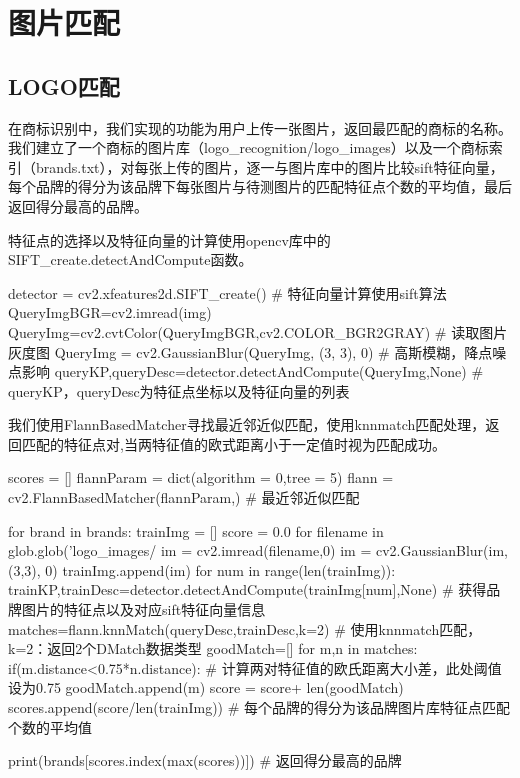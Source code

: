 
\chapter{图片匹配}

\section{LOGO匹配}

在商标识别中，我们实现的功能为用户上传一张图片，返回最匹配的商标的名称。我们建立了一个商标的图片库（logo\_recognition/logo\_images）以及一个商标索引（brands.txt），对每张上传的图片，逐一与图片库中的图片比较sift特征向量，每个品牌的得分为该品牌下每张图片与待测图片的匹配特征点个数的平均值，最后返回得分最高的品牌。

特征点的选择以及特征向量的计算使用opencv库中的SIFT\_create.detectAndCompute函数。

\begin{python}
detector = cv2.xfeatures2d.SIFT_create() # 特征向量计算使用sift算法
QueryImgBGR=cv2.imread(img)
QueryImg=cv2.cvtColor(QueryImgBGR,cv2.COLOR_BGR2GRAY) # 读取图片灰度图
QueryImg = cv2.GaussianBlur(QueryImg, (3, 3), 0) # 高斯模糊，降点噪点影响
queryKP,queryDesc=detector.detectAndCompute(QueryImg,None) # queryKP，queryDesc为特征点坐标以及特征向量的列表
\end{python}

我们使用FlannBasedMatcher寻找最近邻近似匹配，使用knnmatch匹配处理，返回匹配的特征点对,当两特征值的欧式距离小于一定值时视为匹配成功。

\begin{python}
scores = []
flannParam = dict(algorithm = 0,tree = 5)
flann = cv2.FlannBasedMatcher(flannParam,{}) # 最近邻近似匹配

for brand in brands:
    trainImg = []
    score = 0.0
    for filename in glob.glob('logo_images/%
        im = cv2.imread(filename,0)
        im = cv2.GaussianBlur(im, (3,3), 0)
        trainImg.append(im)
    for num in range(len(trainImg)):
        trainKP,trainDesc=detector.detectAndCompute(trainImg[num],None) # 获得品牌图片的特征点以及对应sift特征向量信息
        matches=flann.knnMatch(queryDesc,trainDesc,k=2) # 使用knnmatch匹配，k=2：返回2个DMatch数据类型
        goodMatch=[]
        for m,n in matches:
            if(m.distance<0.75*n.distance): # 计算两对特征值的欧氏距离大小差，此处阈值设为0.75
                goodMatch.append(m)
        score = score+ len(goodMatch)
    scores.append(score/len(trainImg)) # 每个品牌的得分为该品牌图片库特征点匹配个数的平均值

print(brands[scores.index(max(scores))]) # 返回得分最高的品牌
\end{python}


